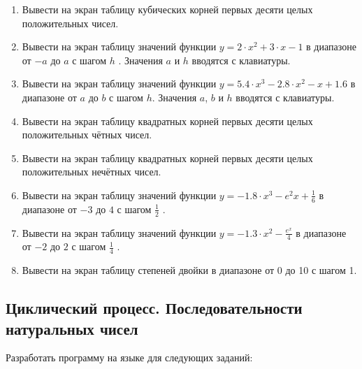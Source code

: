 \begin{enumerate}
\item Вывести на экран таблицу кубических корней первых десяти целых положительных чисел.
\item Вывести на экран таблицу значений функции  $y=2\cdot x^2+3\cdot x-1$  в диапазоне от  $-a$  до  $a$  с шагом 
$h$ . Значения  $a$  и  $h$  вводятся с клавиатуры.
\item Вывести на экран таблицу значений функции  $y=5.4\cdot x^{3}-2.8\cdot x^{2}-x+1.6$  в диапазоне от  $a$  до  $b$ 
с шагом  $h$. Значения  $a$,  $b$  и  $h$  вводятся с клавиатуры.
\item Вывести на экран таблицу квадратных корней первых десяти целых положительных чётных чисел.
\item Вывести на экран таблицу квадратных корней первых десяти целых положительных нечётных чисел.
\item Вывести на экран таблицу значений функции  $y=-1.8\cdot x^3-e^2x+\frac{1}{6}$  в диапазоне от  $-3$ до  $4$  с
шагом  $\frac{1}{2}$ .
\item Вывести на экран таблицу значений функции  $y=-1.3\cdot x^2-\frac{e^x}{4}$  в диапазоне от  $-2$  до  $2$  с
шагом  $\frac{1}{4}$ .
\item Вывести на экран таблицу степеней двойки в диапазоне от  0  до  10  с шагом  1.
\end{enumerate}

\subsection[Циклический процесс. Последовательности натуральных чисел]{Циклический процесс. Последовательности
натуральных чисел}
Разработать программу на языке  для следующих заданий:

